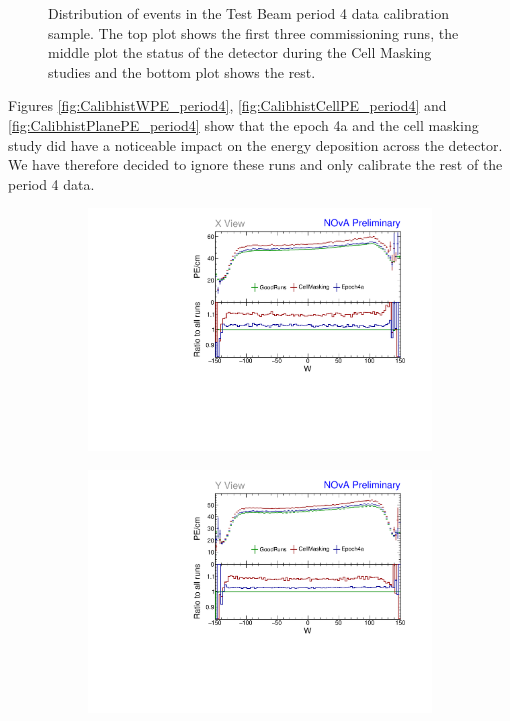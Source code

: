 \begin{figure}[!hbtp]
\begin{subfigure}[b]{\textwidth}
\end{subfigure}
\caption{Distribution of events in the Test Beam period 4 data calibration sample. The top plot shows the first three commissioning runs, the middle plot the status of the detector during the Cell Masking studies and the bottom plot shows the rest.}
\label{fig:Calibhist_period4}
\end{figure}

Figures \ref{fig:CalibhistWPE_period4}, \ref{fig:CalibhistCellPE_period4} and \ref{fig:CalibhistPlanePE_period4} show that the epoch 4a and the cell masking study did have a noticeable impact on the energy deposition across the detector. We have therefore decided to ignore these runs and only calibrate the rest of the period 4 data.

\begin{figure}[!hbtp]
\centering
\begin{subfigure}[b]{0.495\textwidth}
\centering
\includegraphics[width=\textwidth]{PlotsTBCalibTechnote/Attenprofs_P4Data_WPE_corr_xy_X_Combined.pdf}
\end{subfigure}
\begin{subfigure}[b]{0.495\textwidth}
\centering
\includegraphics[width=\textwidth]{PlotsTBCalibTechnote/Attenprofs_P4Data_WPE_corr_xy_Y_Combined.pdf}

\end{subfigure}
\end{figure}
